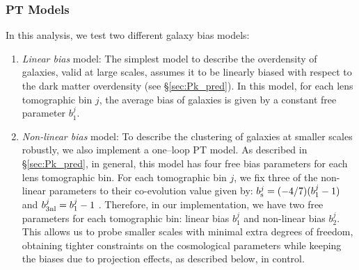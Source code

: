 \documentclass[aps, prd,twocolumn,superscriptaddress,nofootinbib,preprintnumbers]{revtex4-1}
\newcommand{\jdr}[1]{{\color{blue}[JDR: #1]}}
\begin{document}
\subsubsection{PT Models}
\label{sec:pt_models}
In this analysis, we test two different galaxy bias models:
\begin{enumerate}
    \item \textit{Linear bias} model: The simplest model to describe the overdensity of galaxies, valid at large scales, assumes it to be linearly biased with respect to the dark matter overdensity (see \S\ref{sec:Pk_pred}). In this model, for each lens tomographic bin $j$, the average bias of galaxies is given by a constant free parameter $b^j_1$. 
    \item \textit{Non-linear bias} model: 
    To describe the clustering of galaxies at smaller scales robustly, we also implement a one--loop PT model. As described in \S\ref{sec:Pk_pred}, in general, this model has four free bias parameters for each lens tomographic bin. For each tomographic bin $j$, we fix three of the non-linear parameters to their co-evolution value given by: $b^{j}_{\rm s} = (-4/7) (b^j_1 - 1)$ and $b^{j}_{\rm 3nl} = b^j_1 - 1$ \citep{McDonald2009,Saito2014a}. Therefore, in our implementation, we have two free parameters for each tomographic bin: linear bias $b^{j}_1$ and non-linear bias $b^{j}_2$. This allows us to probe smaller scales with minimal extra degrees of freedom, obtaining tighter constraints on the cosmological parameters while keeping the biases due to projection effects, as described below, in control. 
    

\end{enumerate}
\end{document}
